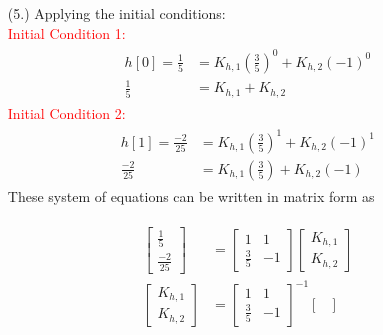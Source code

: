 \documentclass[a4paper, 12pt]{article}
\begin{document}
\begin{itemize}
\begin{itemize}
\begin{itemize}
\begin{itemize}
\begin{center}
\begin{tabular}{|c |c | c | c |c|}
\hline
\end{tabular}
\end{center}
\item[(5.)]{Applying the initial conditions:} \\
\textcolor{red}{Initial Condition 1:}
\begin{equation}
\begin{gathered}
\begin{alignedat}{1}
h[0] = \frac{1}{5} &= K_{h, 1} \left( \frac{3}{5}\right)^{0} + K_{h, 2}\left(-1 \right)^{0} \\
\frac{1}{5} &= K_{h, 1} + K_{h, 2}
\end{alignedat}
\end{gathered}
\end{equation}
\textcolor{red}{Initial Condition 2:}
\begin{equation}
\begin{gathered}
\begin{alignedat}{1}
h[1] = \frac{-2}{25} & = K_{h,1} \left(\frac{3}{5} \right)^{1} + K_{h,2} \left(-1 \right)^{1} \\
\frac{-2}{25} &= K_{h,1} \left(\frac{3}{5} \right) + K_{h,2}(-1)
\end{alignedat}
\end{gathered}
\end{equation}
These system of equations can be written in matrix form as
\begin{center}
\begin{equation}
\begin{gathered}
\begin{alignedat}{1}
\begin{bmatrix}
\frac{1}{5} \\
\frac{-2}{25}
\end{bmatrix} &= 
\begin{bmatrix}
1 & 1 \\
\frac{3}{5} & -1
\end{bmatrix}
\begin{bmatrix}
K_{h,1} \\
K_{h,2}
\end{bmatrix} \\
\begin{bmatrix}
K_{h, 1} \\
K_{h, 2}
\end{bmatrix} &=
\begin{bmatrix}
1 & 1 \\
\frac{3}{5} & -1
\end{bmatrix}^{-1} 
\begin{bmatrix}

\end{bmatrix}
\end{alignedat}
\end{gathered}
\end{equation}
\end{center}
\end{itemize}
\end{itemize}
\end{itemize}
\end{itemize}
\end{document}
